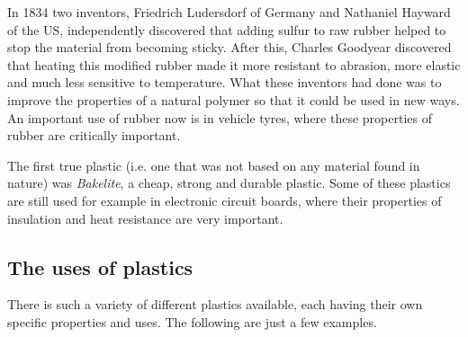 In 1834 two inventors, Friedrich Ludersdorf of Germany and Nathaniel Hayward of the US, independently discovered that adding sulfur to raw rubber helped to stop the material from becoming sticky. After this, Charles Goodyear discovered that heating this modified rubber made it more resistant to abrasion, more elastic and much less sensitive to temperature. What these inventors had done was to improve the properties of a natural polymer so that it could be used in new ways. An important use of rubber now is in vehicle tyres, where these properties of rubber are critically important.

\begin{IFact}{
The first true plastic (i.e. one that was not based on any material found in nature) was \textit{Bakelite}, a cheap, strong and durable plastic. Some of these plastics are still used for example in electronic circuit boards, where their properties of insulation and heat resistance are very important.}
\end{IFact}

\subsection{The uses of plastics}

There is such a variety of different plastics available, each having their own specific properties and uses. The following are just a few examples.

